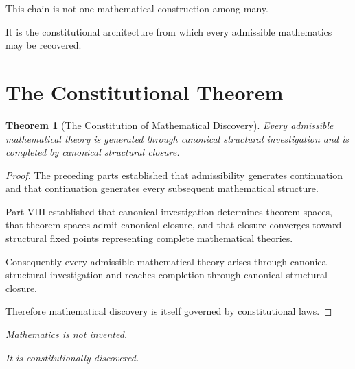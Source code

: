 \documentclass[13pt,openany]{book}
\theoremstyle{plain}
\newtheorem{theorem}{Theorem}[chapter]
\theoremstyle{definition}
\begin{document}
This chain is not one mathematical construction among many.

It is the constitutional architecture from which every admissible mathematics
may be recovered.

\section*{The Constitutional Theorem}

\begin{theorem}[The Constitution of Mathematical Discovery]

Every admissible mathematical theory is generated through canonical structural
investigation and is completed by canonical structural closure.

\end{theorem}

\begin{proof}

The preceding parts established that admissibility generates continuation and
that continuation generates every subsequent mathematical structure.

Part VIII established that canonical investigation determines theorem spaces,
that theorem spaces admit canonical closure, and that closure converges toward
structural fixed points representing complete mathematical theories.

Consequently every admissible mathematical theory arises through canonical
structural investigation and reaches completion through canonical structural
closure.

Therefore mathematical discovery is itself governed by constitutional laws.

\end{proof}

\vspace{2em}

\begin{center}

\Large

\emph{Mathematics is not invented.}

\vspace{0.5em}

\emph{It is constitutionally discovered.}

\end{center}
\end{document}
